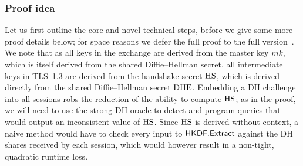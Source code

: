 \iffull
\else


\subsubsection*{Proof idea\lncsdot}
Let us first outline the core and novel technical steps, before we give some more proof details below;
for space reasons we defer the full proof to the full version~\cite{EPRINT:DavGun20}.
We note that as all keys in the \SIGMA exchange are derived from the master key $mk$, which is itself derived from the shared Diffie--Hellman secret, all intermediate keys in TLS~1.3 are derived from the handshake secret $\mathrm{HS}$, which is derived directly from the shared Diffie--Hellman secret $\mathrm{DHE}$.
Embedding a DH challenge into all sessions robs the reduction of the ability to compute $\mathrm{HS}$;
as in the \SIGMA proof, we will need to use the strong DH oracle to detect and program queries that would output an inconsistent value of $\mathrm{HS}$.
Since $\mathrm{HS}$ is derived without context, a naive method would have to check every input to $\mathsf{HKDF}.\mathsf{Extract}$ against the DH shares received by each session, which would however result in a non-tight, quadratic runtime loss. 

